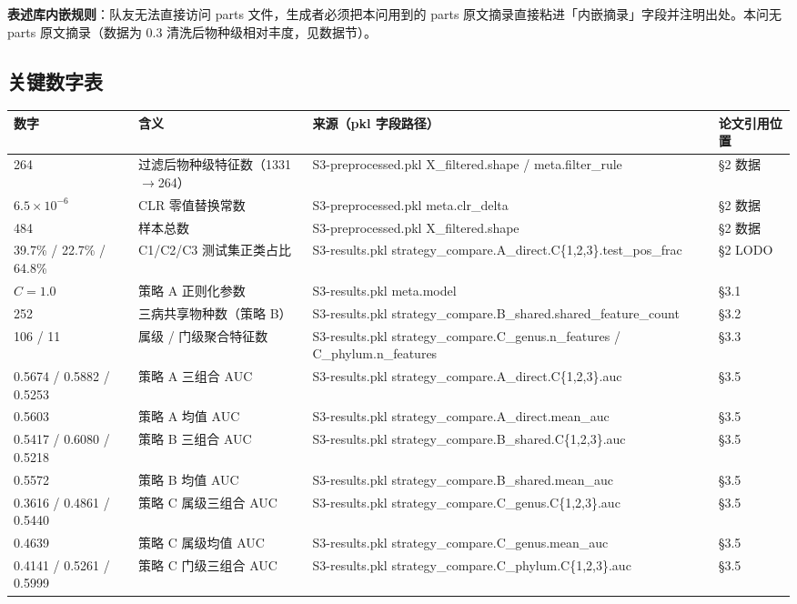 \documentclass{article}   %
\begin{document}
\textbf{表述库内嵌规则}：队友无法直接访问 parts 文件，生成者必须把本问用到的 parts 原文摘录直接粘进「内嵌摘录」字段并注明出处。本问无 parts 原文摘录（数据为 0.3 清洗后物种级相对丰度，见数据节）。

\subsection{关键数字表}

\begin{center}
\footnotesize
\begin{tabular}{llll}
\toprule
数字 & 含义 & 来源（pkl 字段路径） & 论文引用位置 \\
\midrule
264 & 过滤后物种级特征数（1331$\to$264） & S3-preprocessed.pkl X\_filtered.shape / meta.filter\_rule & §2 数据 \\
$6.5\times10^{-6}$ & CLR 零值替换常数 & S3-preprocessed.pkl meta.clr\_delta & §2 数据 \\
484 & 样本总数 & S3-preprocessed.pkl X\_filtered.shape & §2 数据 \\
39.7\% / 22.7\% / 64.8\% & C1/C2/C3 测试集正类占比 & S3-results.pkl strategy\_compare.A\_direct.C\{1,2,3\}.test\_pos\_frac & §2 LODO \\
$C=1.0$ & 策略 A 正则化参数 & S3-results.pkl meta.model & §3.1 \\
252 & 三病共享物种数（策略 B） & S3-results.pkl strategy\_compare.B\_shared.shared\_feature\_count & §3.2 \\
106 / 11 & 属级 / 门级聚合特征数 & S3-results.pkl strategy\_compare.C\_genus.n\_features / C\_phylum.n\_features & §3.3 \\
0.5674 / 0.5882 / 0.5253 & 策略 A 三组合 AUC & S3-results.pkl strategy\_compare.A\_direct.C\{1,2,3\}.auc & §3.5 \\
0.5603 & 策略 A 均值 AUC & S3-results.pkl strategy\_compare.A\_direct.mean\_auc & §3.5 \\
0.5417 / 0.6080 / 0.5218 & 策略 B 三组合 AUC & S3-results.pkl strategy\_compare.B\_shared.C\{1,2,3\}.auc & §3.5 \\
0.5572 & 策略 B 均值 AUC & S3-results.pkl strategy\_compare.B\_shared.mean\_auc & §3.5 \\
0.3616 / 0.4861 / 0.5440 & 策略 C 属级三组合 AUC & S3-results.pkl strategy\_compare.C\_genus.C\{1,2,3\}.auc & §3.5 \\
0.4639 & 策略 C 属级均值 AUC & S3-results.pkl strategy\_compare.C\_genus.mean\_auc & §3.5 \\
0.4141 / 0.5261 / 0.5999 & 策略 C 门级三组合 AUC & S3-results.pkl strategy\_compare.C\_phylum.C\{1,2,3\}.auc & §3.5 \\

\end{tabular}
\end{center}
\end{document}
